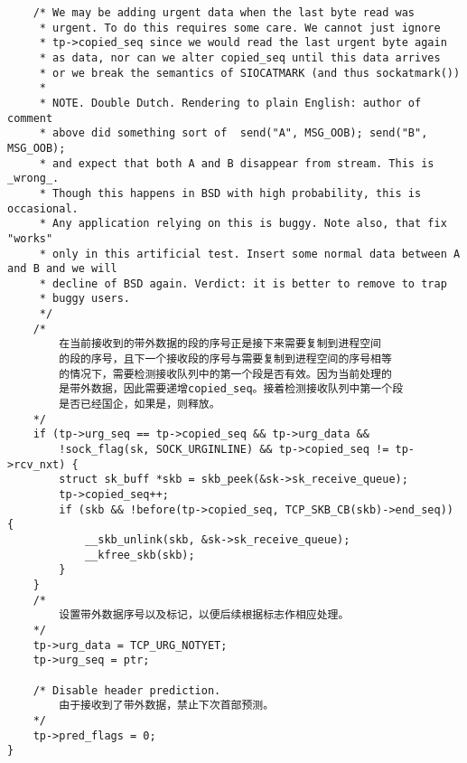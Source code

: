 \begin{verbatim}
	/* We may be adding urgent data when the last byte read was
	 * urgent. To do this requires some care. We cannot just ignore
	 * tp->copied_seq since we would read the last urgent byte again
	 * as data, nor can we alter copied_seq until this data arrives
	 * or we break the semantics of SIOCATMARK (and thus sockatmark())
	 *
	 * NOTE. Double Dutch. Rendering to plain English: author of comment
	 * above did something sort of 	send("A", MSG_OOB); send("B", MSG_OOB);
	 * and expect that both A and B disappear from stream. This is _wrong_.
	 * Though this happens in BSD with high probability, this is occasional.
	 * Any application relying on this is buggy. Note also, that fix "works"
	 * only in this artificial test. Insert some normal data between A and B and we will
	 * decline of BSD again. Verdict: it is better to remove to trap
	 * buggy users.
	 */
	/*
		在当前接收到的带外数据的段的序号正是接下来需要复制到进程空间
		的段的序号，且下一个接收段的序号与需要复制到进程空间的序号相等
		的情况下，需要检测接收队列中的第一个段是否有效。因为当前处理的
		是带外数据，因此需要递增copied_seq。接着检测接收队列中第一个段
		是否已经国企，如果是，则释放。
	*/
	if (tp->urg_seq == tp->copied_seq && tp->urg_data &&
	    !sock_flag(sk, SOCK_URGINLINE) && tp->copied_seq != tp->rcv_nxt) {
		struct sk_buff *skb = skb_peek(&sk->sk_receive_queue);
		tp->copied_seq++;
		if (skb && !before(tp->copied_seq, TCP_SKB_CB(skb)->end_seq)) {
			__skb_unlink(skb, &sk->sk_receive_queue);
			__kfree_skb(skb);
		}
	}
	/*
		设置带外数据序号以及标记，以便后续根据标志作相应处理。
	*/
	tp->urg_data = TCP_URG_NOTYET;
	tp->urg_seq = ptr;

	/* Disable header prediction. 
		由于接收到了带外数据，禁止下次首部预测。	
	*/
	tp->pred_flags = 0;
}
\end{verbatim}
